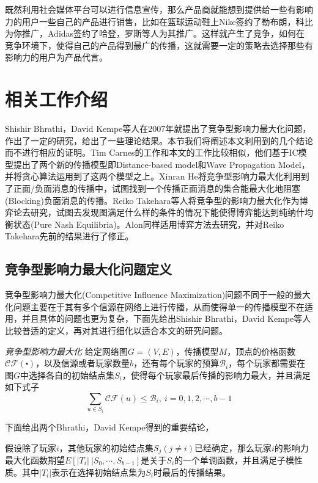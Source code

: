 既然利用社会媒体平台可以进行信息宣传，那么产品商就能想到提供给一些有影响力的用户一些自己的产品进行销售，比如在篮球运动鞋上Nike签约了勒布朗，科比为你推广，Adidas签约了哈登，罗斯等人为其推广。这样就产生了竞争，如何在竞争环境下，使得自己的产品得到最广的传播，这就需要一定的策略去选择那些有影响力的用户为产品代言。

\section{相关工作介绍}
Shishir Bhrathi，David Kempe\cite{bharathi2007competitive}等人在2007年就提出了竞争型影响力最大化问题，作出了一定的研究，给出了一些理论结果。本节我们将阐述本文利用到的几个结论而不进行相应的证明。Tim Carnes\cite{carnes2007maximizing}的工作和本文的工作比较相似，他们基于IC模型提出了两个新的传播模型即Distance-based model和Wave Propagation Model，并将贪心算法运用到了这两个模型之上。Xinran He\cite{he2012influence}将竞争型影响力最大化利用到了正面/负面消息的传播中，试图找到一个传播正面消息的集合能最大化地阻塞(Blocking)负面消息的传播。Reiko Takehara\cite{takehara2012comment}等人将竞争型的影响力最大化作为博弈论去研究，试图去发现图满足什么样的条件的情况下能使得博弈能达到纯纳什均衡状态(Pure Nash Equilibria)。Alon\cite{alon2010note}同样适用博弈方法去研究，并对Reiko Takehara先前的结果进行了修正。


\subsection{竞争型影响力最大化问题定义}
竞争型影响力最大化(Competitive Influence Maximization)问题不同于一般的最大化问题主要在于其有多个信源在网络上进行传播，从而使得单一的传播模型不在适用，并且具体的问题也更为复杂，下面先给出Shishir Bhrathi，David Kempe\cite{bharathi2007competitive}等人比较普适的定义，再对其进行细化以适合本文的研究问题。

\begin{definition}
\label{def:chap4-bhrathi-kempe-cim}
\emph{竞争型影响力最大化}
给定网络图$G=(V,E)$，传播模型$M$，顶点的价格函数$\mathcal{CF}(\centerdot)$，以及信源或者玩家数量$b$，还有每个玩家的预算$\mathcal{B}_{i}$，每个玩家都需要在图$G$中选择各自的初始结点集$S_{i}$，使得每个玩家最后传播的影响力最大，并且满足如下式子
\begin{displaymath}
\sum_{u \in S_{i}}\mathcal{CF}(u) \leq \mathcal{B}_{i}, ~i=0,1,2,\cdots,b-1
\end{displaymath}
\end{definition}


下面给出两个Bhrathi，David Kempe\cite{bharathi2007competitive}得到的重要结论，
\begin{lemma}
\label{lemma:chap4-functionalities}
假设除了玩家$i$，其他玩家的初始结点集$S_{j}(j \neq i)$已经确定，那么玩家$i$的影响力最大化函数期望$E[|T_{i}|~|S_{0},\cdots ,S_{b-1}]$是关于$S_{i}$的一个单调函数，并且满足子模性质。其中$|T_{i}|$表示在选择初始结点集为$S_{i}$时最后的传播结果。
\end{lemma}

